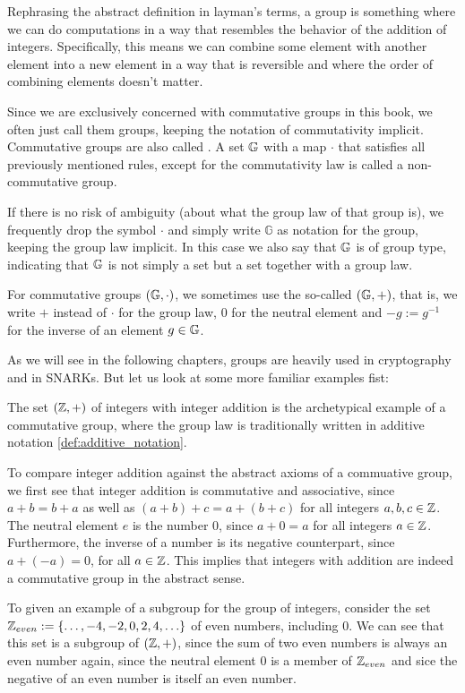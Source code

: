 Rephrasing the abstract definition in layman's terms, a group is something where we can do computations in a way that resembles the behavior of the addition of integers. Specifically, this means we can combine some element with another element into a new element in a way that is reversible and where the order of combining elements doesn't matter.
\begin{notation}Since we are exclusively concerned with commutative groups in this book, we often just call them groups, keeping the notation of commutativity implicit. Commutative groups are also called . A set $\mathbb{G}$ with a map $\cdot$ that satisfies all previously mentioned rules, except for the commutativity law is called a non-commutative group. 

If there is no risk of ambiguity (about what the group law of that group is), we frequently drop the symbol $\cdot$ and simply write $\mathbb{G}$ as notation for the group, keeping the group law implicit. In this case we also say that $\mathbb{G}$ is of group type, indicating that $\mathbb{G}$ is not simply a set but a set together with a group law.

For commutative groups $(\mathbb{G},\cdot)$, we sometimes use the so-called \label{def:additive_notation} $(\mathbb{G},+)$, that is, we write $+$ instead of $\cdot$ for the group law, $0$ for the neutral element and $-g:=g^{-1}$ for the inverse of an element $g\in\mathbb{G}$.
\end{notation}
As we will see in the following chapters, groups are heavily used in cryptography and in SNARKs. But let us look at some more familiar examples fist:
\begin{example}
\label{example:group_of_integers}
The set $(\mathbb{Z},+)$ of integers with integer addition is the archetypical example of a commutative group, where the group law is traditionally written in additive notation \ref{def:additive_notation}. 

To compare integer addition against the abstract axioms of a commuative group, we first see that integer addition is commutative and associative, since $a+b = b+a$ as well as $(a+b)+c=a+(b+c)$ for all integers $a,b,c\in \mathbb{Z}$. The neutral element $e$ is the number $0$, since $a+0=a$ for all integers $a\in \mathbb{Z}$. Furthermore, the inverse of a number is its negative counterpart, since $a+(-a)=0$, for all $a\in\mathbb{Z}$. This implies that integers with addition are indeed a commutative group in the abstract sense.

To given an example of a subgroup for the group of integers, consider the set $\mathbb{Z}_{even}:=\{\ldots,-4,-2,0,2,4,\ldots\}$ of even numbers, including $0$. We can see that this set is a subgroup of $(\mathbb{Z},+)$, since the sum of two even numbers is always an even number again, since the neutral element $0$ is a member of $\mathbb{Z}_{even}$ and sice the negative of an even number is itself an even number. 
\end{example}
